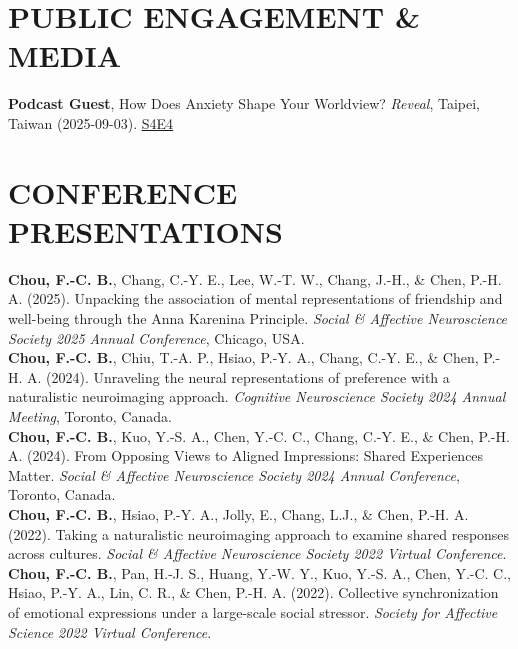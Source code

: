 \documentclass[a4paper,12pt]{article}
\newcommand{\sectionspace}{0pt} %
\newcommand{\itemspace}{7pt} %
\begin{document}
\vspace{\sectionspace}

\section*{PUBLIC ENGAGEMENT \& MEDIA}
\noindent\textbf{Podcast Guest}, How Does Anxiety Shape Your Worldview? \textit{Reveal}, Taipei, Taiwan (2025-09-03). \href{https://podcasts.apple.com/tw/podcast/%E9%87%8D%E6%95%B4%E8%A9%95%E4%BC%B0/id1747099567?l=en-GB&i=1000724790000}{S4E4} \\[\itemspace]

\vspace{\sectionspace}

\section*{CONFERENCE PRESENTATIONS}
\noindent\textbf{Chou, F.-C. B.}, Chang, C.-Y. E., Lee, W.-T. W., Chang, J.-H., \& Chen, P.-H. A. (2025). Unpacking the association of mental representations of friendship and well-being through the Anna Karenina Principle. \textit{Social \& Affective Neuroscience Society 2025 Annual Conference}, Chicago, USA. \\[\itemspace]
\noindent\textbf{Chou, F.-C. B.}, Chiu, T.-A. P., Hsiao, P.-Y. A., Chang, C.-Y. E., \& Chen, P.-H. A. (2024). Unraveling the neural representations of preference with a naturalistic neuroimaging approach. \textit{Cognitive Neuroscience Society 2024 Annual Meeting}, Toronto, Canada.\\[\itemspace]
\noindent\textbf{Chou, F.-C. B.}, Kuo, Y.-S. A., Chen, Y.-C. C., Chang, C.-Y. E., \& Chen, P.-H. A. (2024). From Opposing Views to Aligned Impressions: Shared Experiences Matter. \textit{Social \& Affective Neuroscience Society 2024 Annual Conference}, Toronto, Canada. \\[\itemspace]
\noindent\textbf{Chou, F.-C. B.}, Hsiao, P.-Y. A., Jolly, E., Chang, L.J., \& Chen, P.-H. A. (2022). Taking a naturalistic neuroimaging approach to examine shared responses across cultures. \textit{Social \& Affective Neuroscience Society 2022 Virtual Conference}.\\[\itemspace]
\noindent\textbf{Chou, F.-C. B.}, Pan, H.-J. S., Huang, Y.-W. Y., Kuo, Y.-S. A., Chen, Y.-C. C., Hsiao, P.-Y. A., Lin, C. R., \& Chen, P.-H. A. (2022). Collective synchronization of emotional expressions under a large-scale social stressor. \textit{Society for Affective Science 2022 Virtual Conference}.\\[\itemspace]
\end{document}
